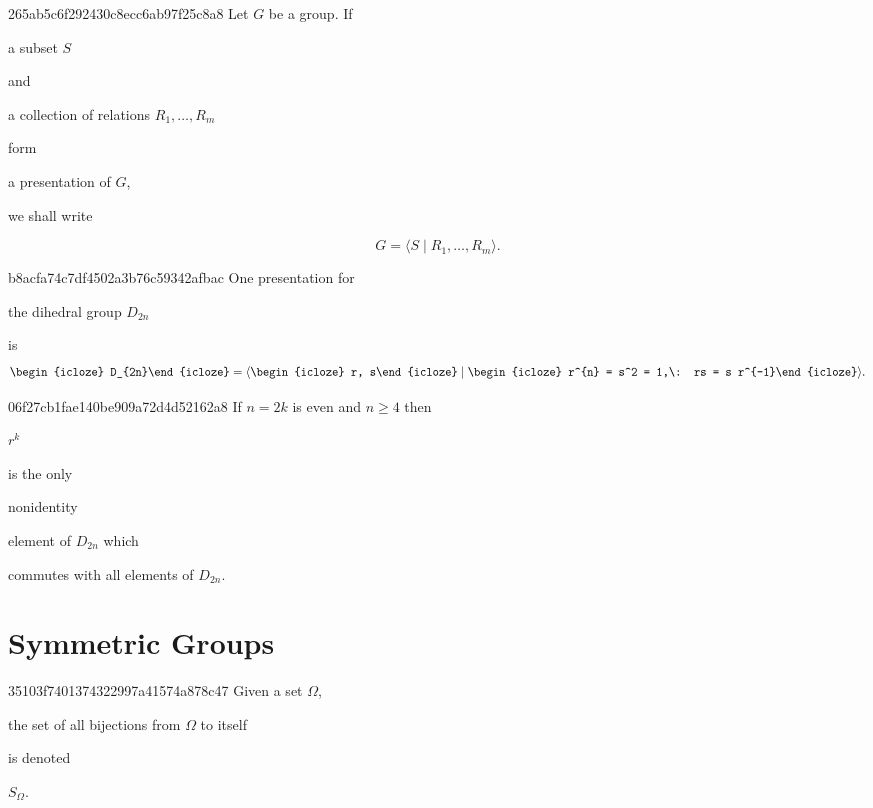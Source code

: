 \begin{note}{265ab5c6f292430c8ecc6ab97f25c8a8}
    Let \({ G }\) be a group. If \begin{icloze}{4}a subset \({ S }\)\end{icloze} and \begin{icloze}{3}a collection of relations \({ R_1, \ldots, R_{m} }\)\end{icloze} form \begin{icloze}{2}a presentation of \({ G }\),\end{icloze} we shall write
    \begin{icloze}{1}
        \[
            G = \langle S \mid R_1, \ldots, R_{m} \rangle.
        \]
    \end{icloze}
\end{note}

\begin{note}{b8acfa74c7df4502a3b76c59342afbac}
    One presentation for \begin{icloze}{3}the dihedral group \({ D_{2n} }\)\end{icloze} is
    \[
        \begin{icloze}{3}D_{2n}\end{icloze} = \langle \begin{icloze}{2}r, s\end{icloze} \mid \begin{icloze}{1}r^{n} = s^2 = 1,\: rs = s r^{-1}\end{icloze} \rangle.
    \]
\end{note}

\begin{note}{06f27cb1fae140be909a72d4d52162a8}
    If \({ n = 2k }\) is even and \({ n \geq 4 }\) then \begin{icloze}{3}\({ r^{k} }\)\end{icloze} is the only \begin{icloze}{2}nonidentity\end{icloze} element of \({ D_{2n} }\) which \begin{icloze}{1}commutes with all elements of \({ D_{2n} }\).\end{icloze}
\end{note}

\section{Symmetric Groups}
\begin{note}{35103f7401374322997a41574a878c47}
    Given a set \({ \Omega }\), \begin{icloze}{1}the set of all bijections from \({ \Omega }\) to itself\end{icloze} is denoted \begin{icloze}{2}\({ S_{\Omega} }\).\end{icloze}
\end{note}

